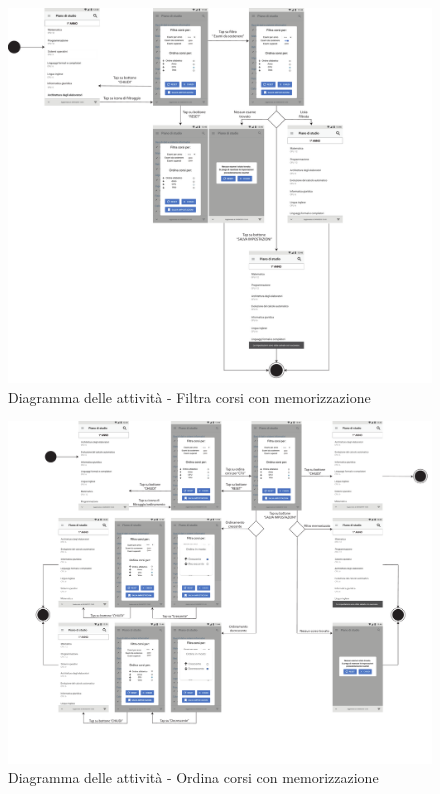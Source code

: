 \begin{figure}
	\centering
	\includegraphics[width=6in]{imgs/gruppo1/activity_diagrams/AD3_filtra_corsi.pdf}
	\caption{Diagramma delle attività - Filtra corsi con memorizzazione}
	\label{diag:filtraCorsiConMemAD}
\end{figure}
\newpage

\begin{figure}
	\centering
	\includegraphics[width=6in]{imgs/gruppo1/activity_diagrams/AD4_ordina_corsi.pdf}
	\caption{Diagramma delle attività - Ordina corsi con memorizzazione}
	\label{diag:ordinaCorsiConMemAD}
\end{figure}

\clearpage
